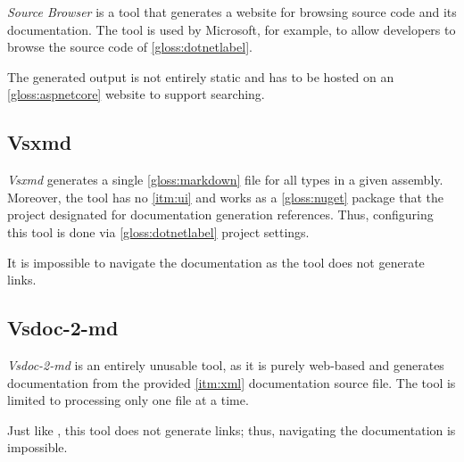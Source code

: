 \textit{Source Browser} is a tool that generates a website for browsing source code and its documentation. The tool is used by Microsoft, for example, to allow developers to browse the source code of \ref{gloss:dotnetlabel}.

The generated output is not entirely static and has to be hosted on an \ref{gloss:aspnetcore} website to support searching.

\subsection{Vsxmd} \label{ssec:vsxmd}

\textit{Vsxmd} generates a single \ref{gloss:markdown} file for all types in a given assembly. Moreover, the tool has no \ref{itm:ui} and works as a \ref{gloss:nuget} package that the project designated for documentation generation references. Thus, configuring this tool is done via \ref{gloss:dotnetlabel} project settings.

It is impossible to navigate the documentation as the tool does not generate links.

\subsection{Vsdoc-2-md}

\textit{Vsdoc-2-md} is an entirely unusable tool, as it is purely web-based and generates documentation from the provided \ref{itm:xml} documentation source file. The tool is limited to processing only one file at a time.

Just like \textit{}, this tool does not generate links; thus, navigating the documentation is impossible.

\newpage

